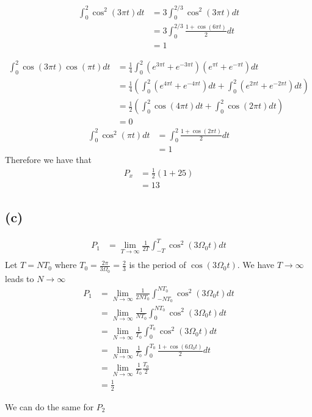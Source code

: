 \documentclass[12pt]{article}
\begin{document}
\begin{align*}
\int_{0}^{2}\cos^2(3\pi t)dt&=3\int_{0}^{2/3}\cos^2(3\pi t)dt\\
&=3\int_{0}^{2/3}\frac{1+\cos(6\pi t)}{2}dt\\
&=1
\end{align*}

\begin{align*}
\int_{0}^{2}\cos(3\pi t)\cos(\pi t)dt&=\frac{1}{4}\int_{0}^{2}(e^{3\pi t}+e^{-3\pi t})(e^{\pi t}+e^{-\pi t})dt\\
&=\frac{1}{4}\left(\int_{0}^{2}(e^{4\pi t}+e^{-4\pi t})dt+\int_{0}^{2}(e^{2\pi t}+e^{-2\pi t})dt\right)\\
&=\frac{1}{2}\left(\int_{0}^{2}\cos(4\pi t)dt+\int_{0}^{2}\cos(2\pi t)dt\right)\\
&=0
\end{align*}
\begin{align*}
\int_{0}^{2}\cos^2(\pi t)dt&=\int_{0}^{2}\frac{1+\cos(2\pi t)}{2}dt\\
&=1
\end{align*}
Therefore we have that
\begin{align*}
P_x&=\frac{1}{2}(1+25)\\
&=\boxed{13}
\end{align*}
\subsection*{(c)}
\begin{align*}
P_1&=\lim_{T\to\infty}\frac{1}{2T}\int_{-T}^{T} \cos^2(3\Omega_0 t)dt\\
\end{align*}
Let $T=NT_0$ where $T_0=\frac{2\pi}{3\Omega_0}=\frac{2}{3}$ is the period of  $\cos(3\Omega_0 t)$. We have $T\to\infty$ leads to $N\to\infty$
\begin{align*}
P_1&=\lim_{N\to\infty}\frac{1}{2NT_0}\int_{-NT_0}^{NT_0} \cos^2(3\Omega_0 t)dt\\
&=\lim_{N\to\infty}\frac{1}{NT_0}\int_{0}^{NT_0} \cos^2(3\Omega_0 t)dt\\
&=\lim_{N\to\infty}\frac{1}{T_0}\int_{0}^{T_0} \cos^2(3\Omega_0 t)dt\\
&=\lim_{N\to\infty}\frac{1}{T_0}\int_{0}^{T_0} \frac{1+\cos(6\Omega_0 t)}{2}dt\\
&=\lim_{N\to\infty}\frac{1}{T_0}\frac{T_0}{2}\\
&=\frac{1}{2}
\end{align*}

We can do the same for $P_2$
\end{document}
